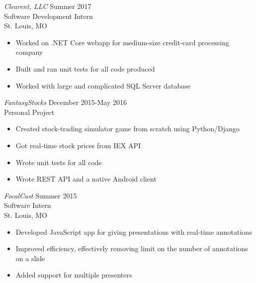 \documentclass[margin]{res}
\begin{document}
\begin{resume}
                {\sl Clearent, LLC } \hfill            Summer 2017 \\
                Software Development Intern \\
                St. Louis, MO
            \begin{itemize}  \itemsep -2pt %
                    \item Worked on .NET Core webapp for medium-size credit-card processing company
                    \item Built and ran unit tests for all code produced
                    \item Worked with large and complicated SQL Server database
            \end{itemize} 

             {\sl FantasyStocks} \hfill December 2015-May 2016 \\
             Personal Project 
         \begin{itemize} \itemsep -2pt %
                 \item Created stock-trading simulator game from scratch using Python/Django
                 \item Got real-time stock prices from IEX API
                 \item Wrote unit tests for all code
                 \item Wrote REST API and a native Android client
         \end{itemize}


    {\sl FocalCast} \hfill Summer 2015 \\
                Software Intern               \\
                St. Louis, MO
            \begin{itemize} \itemsep -2pt %
                    \item Developed JavaScript app for giving presentations with real-time annotations
                    \item Improved efficiency, effectively removing limit on the number of annotations on a slide
                    \item Added support for multiple presenters
            \end{itemize}


\end{resume}
\end{document}
